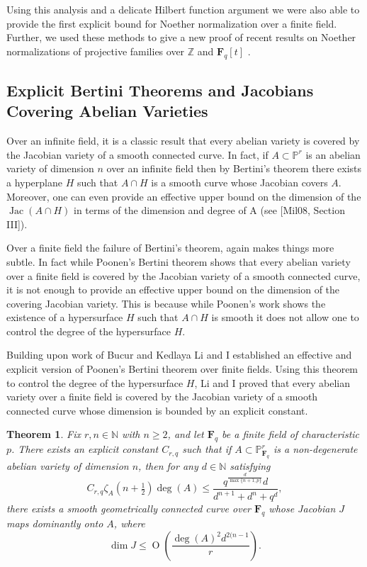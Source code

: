 \documentclass[10pt,reqno]{amsart}
\newtheorem{theorem}[lemma]{Theorem}
\theoremstyle{remark}
\newcommand{\Jac}{\operatorname{Jac}}
\newcommand{\fF}{\mathbf F}
\newcommand{\OO}{\operatorname{O}}
\newcommand{\N}{\mathbb{N}}
\renewcommand{\P}{\mathbb{P}}
\newcommand{\Z}{\mathbb{Z}}
\begin{document}
Using this analysis and a delicate Hilbert function argument we were also able to provide the first explicit bound for Noether normalization over a finite field. Further, we used these methods to give a new proof of recent results on Noether normalizations of projective families over $\Z$ and $\fF_{q}[t]$ \cite{gabberLiuLorenzini15, cmbpt}.



\subsection{Explicit Bertini Theorems and Jacobians Covering Abelian Varieties}

Over an infinite field, it is a classic result that every abelian variety is covered by the Jacobian variety of a smooth connected curve. In fact, if $A\subset \P^r$ is an abelian variety of dimension $n$ over an infinite field then by Bertini's theorem there exists a hyperplane $H$ such that $A\cap H$ is a smooth curve whose Jacobian covers $A$. Moreover, one can even provide an effective upper bound on the dimension of the $\Jac(A\cap H)$ in terms of the dimension and degree of A (see [Mil08, Section III]).

Over a finite field the failure of Bertini's theorem, again makes things more subtle. In fact while Poonen's Bertini theorem shows that every abelian variety over a finite field is covered by the Jacobian variety of a smooth connected curve, it is not enough to provide an effective upper bound on the dimension of the covering Jacobian variety. This is because while Poonen's work shows the existence of a hypersurface $H$ such that $A\cap H$ is smooth it does not allow one to control the degree of the hypersurface $H$. 

Building upon work of Bucur and Kedlaya \cite{bucurKedlaya12} Li and I established an effective and explicit version of Poonen's Bertini theorem over finite fields. Using this theorem to control the degree of the hypersurface $H$, Li and I proved that every abelian variety over a finite field is covered by the Jacobian variety of a smooth connected curve whose dimension is bounded by an explicit constant. 

\begin{theorem}
Fix $r,n\in \N$ with $n\geq2$, and let $\fF_{q}$ be a finite field of characteristic $p$. There exists an explicit constant $C_{r,q}$ such that if $A\subset \P^{r}_{\fF_q}$ is a non-degenerate abelian variety of dimension $n$, then for any $d\in \N$ satisfying 
\[
C_{r,q}\zeta_{A}\left(n+\tfrac{1}{2}\right) \deg(A) \leq  \frac{q^{\frac{d}{\max\{n+1,p\}}}d}{d^{n+1}+d^n+q^{d}},
\]
there exists a smooth geometrically connected curve over $\fF_{q}$ whose Jacobian $J$ maps dominantly onto $A$, where 
\[
\dim J\leq 
\OO\left(\frac{ \deg(A)^2 d^{2(n-1}}{r}\right).
\]
\end{theorem} 
\end{document}

